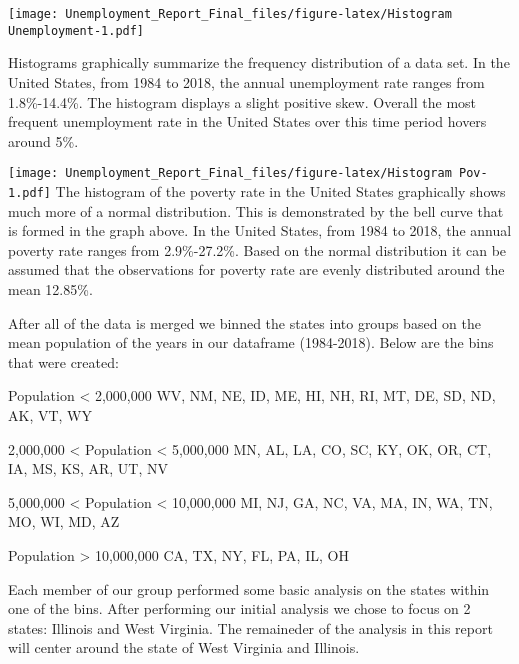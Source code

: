 \documentclass[
]{article}
\newenvironment{Shaded}{\begin{snugshade}}{\end{snugshade}}
\newcommand{\CharTok}[1]{\textcolor[rgb]{0.31,0.60,0.02}{#1}}
\newcommand{\DataTypeTok}[1]{\textcolor[rgb]{0.13,0.29,0.53}{#1}}
\newcommand{\DecValTok}[1]{\textcolor[rgb]{0.00,0.00,0.81}{#1}}
\newcommand{\KeywordTok}[1]{\textcolor[rgb]{0.13,0.29,0.53}{\textbf{#1}}}
\newcommand{\NormalTok}[1]{#1}
\newcommand{\OperatorTok}[1]{\textcolor[rgb]{0.81,0.36,0.00}{\textbf{#1}}}
\newcommand{\StringTok}[1]{\textcolor[rgb]{0.31,0.60,0.02}{#1}}
\begin{document}
\texttt{[image: Unemployment\_Report\_Final\_files/figure-latex/Histogram Unemployment-1.pdf]}

Histograms graphically summarize the frequency distribution of a data
set. In the United States, from 1984 to 2018, the annual unemployment
rate ranges from 1.8\%-14.4\%. The histogram displays a slight positive
skew. Overall the most frequent unemployment rate in the United States
over this time period hovers around 5\%.

\begin{Shaded}
\end{Shaded}

\texttt{[image: Unemployment\_Report\_Final\_files/figure-latex/Histogram Pov-1.pdf]}
The histogram of the poverty rate in the United States graphically shows
much more of a normal distribution. This is demonstrated by the bell
curve that is formed in the graph above. In the United States, from 1984
to 2018, the annual poverty rate ranges from 2.9\%-27.2\%. Based on the
normal distribution it can be assumed that the observations for poverty
rate are evenly distributed around the mean 12.85\%.

After all of the data is merged we binned the states into groups based
on the mean population of the years in our dataframe (1984-2018). Below
are the bins that were created:

Population \textless{} 2,000,000 WV, NM, NE, ID, ME, HI, NH, RI, MT, DE,
SD, ND, AK, VT, WY

2,000,000 \textless{} Population \textless{} 5,000,000 MN, AL, LA, CO,
SC, KY, OK, OR, CT, IA, MS, KS, AR, UT, NV

5,000,000 \textless{} Population \textless{} 10,000,000 MI, NJ, GA, NC,
VA, MA, IN, WA, TN, MO, WI, MD, AZ

Population \textgreater{} 10,000,000 CA, TX, NY, FL, PA, IL, OH

Each member of our group performed some basic analysis on the states
within one of the bins. After performing our initial analysis we chose
to focus on 2 states: Illinois and West Virginia. The remaineder of the
analysis in this report will center around the state of West Virginia
and Illinois.
\end{document}
